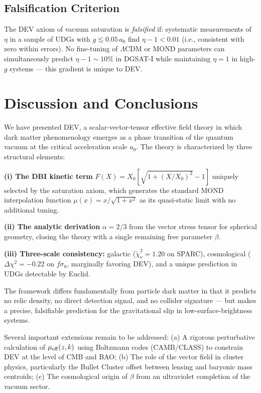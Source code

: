 \documentclass[aps,prd,twocolumn,showpacs,superscriptaddress]{revtex4-2}
\newcommand{\aO}{a_0}
\newcommand{\Xzero}{X_0}
\newcommand{\mueff}{\mu_{\rm eff}}
\newcommand{\LCDM}{$\Lambda$CDM}
\begin{document}
\subsection{Falsification Criterion}

The DEV axiom of vacuum saturation is \emph{falsified} if:
systematic measurements of $\eta$ in a sample of UDGs with
$g \lesssim 0.05\,\aO$ find $\eta - 1 < 0.01$ (i.e., consistent
with zero within errors).
No fine-tuning of \LCDM{} or MOND parameters can simultaneously
predict $\eta - 1 \sim 10\%$ in DGSAT-I while maintaining
$\eta = 1$ in high-$g$ systems — this gradient is unique to DEV.

\section{Discussion and Conclusions}
\label{sec:conclusion}

We have presented DEV, a scalar-vector-tensor effective field theory
in which dark matter phenomenology emerges as a phase transition of
the quantum vacuum at the critical acceleration scale $\aO$.
The theory is characterized by three structural elements:

\textbf{(i) The DBI kinetic term} $F(X) = \Xzero[\sqrt{1+(X/\Xzero)^2}-1]$
uniquely selected by the saturation axiom, which generates the
standard MOND interpolation function $\mu(x) = x/\sqrt{1+x^2}$
as its quasi-static limit with no additional tuning.

\textbf{(ii) The analytic derivation} $\alpha = 2/3$ from the vector
stress tensor for spherical geometry, closing the theory with a
single remaining free parameter $\beta$.

\textbf{(iii) Three-scale consistency:}
galactic ($\widetilde\chi^2_\nu = 1.20$ on SPARC),
cosmological ($\Delta\chi^2 = -0.22$ on $f\sigma_8$,
marginally favoring DEV),
and a unique prediction in UDGs detectable by Euclid.

The framework differs fundamentally from particle dark matter
in that it predicts no relic density, no direct detection signal,
and no collider signature — but makes a precise, falsifiable
prediction for the gravitational slip in low-surface-brightness systems.

Several important extensions remain to be addressed:
(a) A rigorous perturbative calculation of $\mueff(z,k)$
    using Boltzmann codes (CAMB/CLASS) to constrain DEV at the
    level of CMB and BAO;
(b) The role of the vector field in cluster physics,
    particularly the Bullet Cluster offset between lensing
    and baryonic mass centroids;
(c) The cosmological origin of $\beta$ from an ultraviolet
    completion of the vacuum sector.
\end{document}
